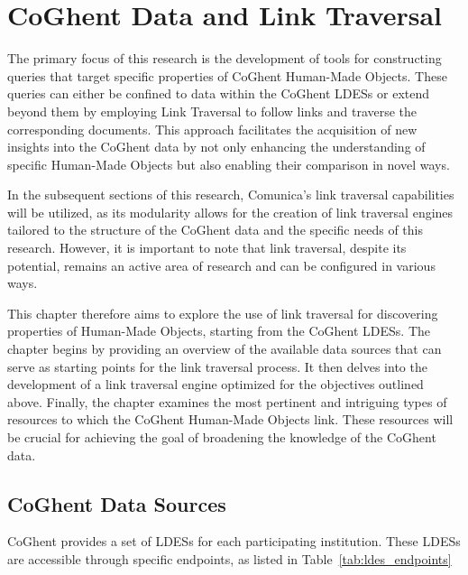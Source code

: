 \chapter{CoGhent Data and Link Traversal}
\label{chap:coghent_link_traversal}

The primary focus of this research is the development of tools for constructing queries that target specific properties of CoGhent Human-Made Objects. These queries can either be confined to data within the CoGhent LDESs or extend beyond them by employing Link Traversal to follow links and traverse the corresponding documents. This approach facilitates the acquisition of new insights into the CoGhent data by not only enhancing the understanding of specific Human-Made Objects but also enabling their comparison in novel ways.

In the subsequent sections of this research, Comunica's link traversal capabilities will be utilized, as its modularity allows for the creation of link traversal engines tailored to the structure of the CoGhent data and the specific needs of this research. However, it is important to note that link traversal, despite its potential, remains an active area of research and can be configured in various ways.

This chapter therefore aims to explore the use of link traversal for discovering properties of Human-Made Objects, starting from the CoGhent LDESs. The chapter begins by providing an overview of the available data sources that can serve as starting points for the link traversal process. It then delves into the development of a link traversal engine optimized for the objectives outlined above. Finally, the chapter examines the most pertinent and intriguing types of resources to which the CoGhent Human-Made Objects link. These resources will be crucial for achieving the goal of broadening the knowledge of the CoGhent data.

\section{CoGhent Data Sources}
\label{sec:coghent_data_sources}

CoGhent provides a set of LDESs for each participating institution. These LDESs are accessible through specific endpoints, as listed in Table~\ref{tab:ldes_endpoints}

